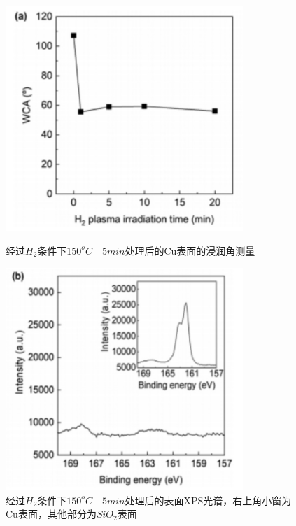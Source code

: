 \documentclass[UTF8,a4paper,12pt]{ctexart}%
\begin{document}
\begin{figure}[htb]
	\centering
	\begin{minipage}[t]{0.5\textwidth}
	\centering
	\includegraphics[width=0.8\textwidth]{13.jpg}
	\caption{经过$H_2$条件下$150^oC \quad 5 min$处理后的Cu表面的浸润角测量}
	\label{Fig:13}
	\end{minipage}
	\begin{minipage}[t]{0.45\textwidth}
	\centering
	\includegraphics[width=0.8\textwidth]{14.jpg}
	\caption{经过$H_2$条件下$150^oC \quad 5 min$处理后的表面XPS光谱，右上角小窗为Cu表面，其他部分为$SiO_2$表面}
	\label{Fig:14}
	\end{minipage}
\end{figure}
\end{document}

